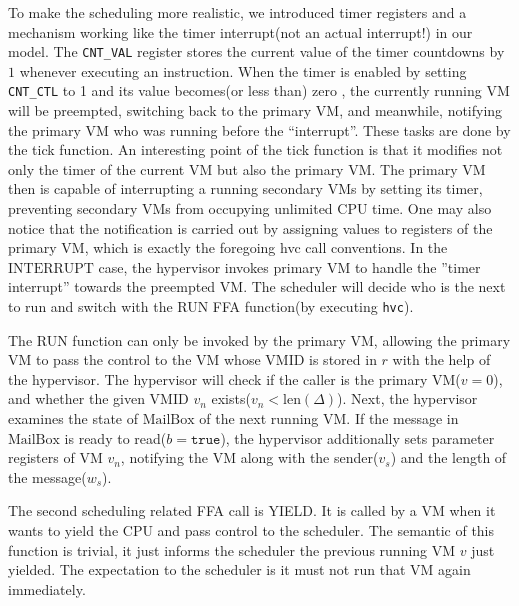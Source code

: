 \documentclass[a4paper]{article}
\newcommand*{\VMID}{\text{VMID}}
\newcommand*{\MB}{\text{MailBox}}
\newcommand*{\INT}{\text{INTERRUPT}}
\newcommand*{\instr}[1]{\texttt{#1}}
\begin{document}
To make the scheduling more realistic, we introduced timer registers and a
mechanism working like the timer interrupt(not an actual interrupt!) in our
model. The \texttt{CNT\_VAL} register stores the current value of the
timer countdowns by $1$ whenever executing an instruction. When the timer is
enabled by setting \texttt{CNT\_CTL} to 1 and its value becomes(or less than)
zero , the currently running VM will be preempted, switching back to the primary
VM, and meanwhile, notifying the primary VM who was running before the
``interrupt''. These tasks are done by the tick function. An interesting point
of the tick function is that it modifies not only the timer of the current VM but
also the primary VM. The primary VM then is capable of interrupting a running
secondary VMs by setting its timer, preventing secondary VMs from occupying
unlimited CPU time. One may also notice that the notification is carried out by
assigning values to registers of the primary VM, which is exactly the foregoing hvc
call conventions.
In the $\INT$ case, the hypervisor invokes primary VM to handle the ''timer
interrupt'' towards the preempted VM. The scheduler will decide who is the next
to run and switch with the RUN FFA function(by executing \instr{hvc}).


The RUN function can only be invoked by the primary VM, allowing the primary VM to pass
the control to the VM whose $\VMID$ is stored in $r$ with the help of the
hypervisor. The hypervisor will check if the caller is the primary VM($v=0$),
and whether the given $\VMID$ $v_{n}$ exists($v_{n} < \text{len}(\Delta)$).
Next, the hypervisor examines the state of $\MB$ of the next running VM. If the
message in $\MB$ is ready to read($b=\mathtt{true}$), the hypervisor
additionally sets parameter registers of VM $v_{n}$, notifying the VM along with
the sender($v_{s}$) and the length of the message($w_{s}$).

The second scheduling related FFA call is YIELD. It is called by a VM when it
wants to yield the CPU and pass control to the scheduler. The semantic of this
function is trivial, it just informs the scheduler the previous running VM $v$
just yielded. The expectation to the scheduler is it must not run that VM again
immediately.
\end{document}

